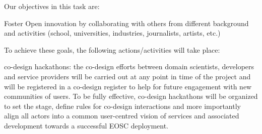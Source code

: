 \begin{task}[
  title=Training Workshops for more reproducible science,
  id=workshops,
  lead=UIO,
  PM=10,
  wphases={12-36!.416},
  partners={SRL,MP,IFR}
]
Our objectives in this task are: 
  \begin{compactitem}

% 
% 

% 

\item Foster Open innovation by collaborating with others from different background and activities (school, universities, industries, journalists, artists, etc.)
  \end{compactitem}

To achieve these goals, the following actions/activities will take place:

  \begin{compactitem}
   \item co-design hackathons: the co-design efforts between domain scientists, \TheProject developers and service providers will be carried out at any point in time of the project and will be registered in a co-design register to help for future engagement with new communities of users. To be fully effective,  co-design hackathons will be organized to set the stage, define rules for co-design interactions and more importantly align all actors into a common user-centred vision of \TheProject services and associated development towards a successful EOSC deployment.



\end{compactitem}
\end{task}
